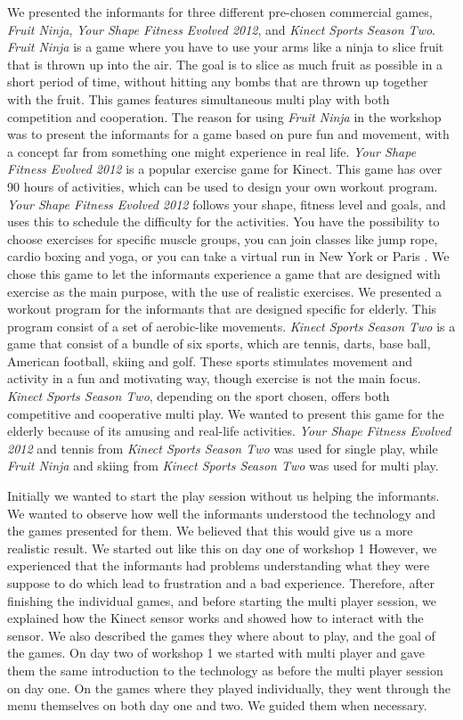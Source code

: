 We presented the informants for three different pre-chosen commercial games, \emph{Fruit Ninja}, \emph{Your Shape Fitness Evolved 2012}, and \emph{Kinect Sports Season Two}. \emph{Fruit Ninja} is a game where you have to use your arms like a ninja to slice fruit that is thrown up into the air. The goal is to slice as much fruit as possible in a short period of time, without hitting any bombs that are thrown up together with the fruit. This games features simultaneous multi play with both competition and cooperation. The reason for using \emph{Fruit Ninja} in the workshop was to present the informants for a game based on pure fun and movement, with a concept far from something one might experience in real life. \emph{Your Shape Fitness Evolved 2012} is a popular exercise game for Kinect. This game has over 90 hours of activities, which can be used to design your own workout program. \emph{Your Shape Fitness Evolved 2012} follows your shape, fitness level and goals, and uses this to schedule the difficulty for the activities. You have the possibility to choose exercises for specific muscle groups, you can join classes like jump rope, cardio boxing and yoga, or you can take a virtual run in New York or Paris \cite{yourshape}. We chose this game to let the informants experience a game that are designed with exercise as the main purpose, with the use of realistic exercises. We presented a workout program for the informants that are designed specific for elderly. This program consist of a set of aerobic-like movements. \emph{Kinect Sports Season Two} is a game that consist of a bundle of six sports, which are tennis, darts, base ball, American football, skiing and golf. These sports stimulates movement and activity in a fun and motivating way, though exercise is not the main focus. \emph{Kinect Sports Season Two}, depending on the sport chosen, offers both competitive and cooperative multi play. We wanted to present this game for the elderly because of its amusing and real-life activities. \emph{Your Shape Fitness Evolved 2012} and tennis from \emph{Kinect Sports Season Two} was used for single play, while \emph{Fruit Ninja} and skiing from \emph{Kinect Sports Season Two} was used for multi play. 

Initially we wanted to start the play session without us helping the informants. We wanted to observe how well the informants understood the technology and the games presented for them. We believed that this would give us a more realistic result. We started out like this on day one of workshop 1 However, we experienced that the informants had problems understanding what they were suppose to do which lead to frustration and a bad experience. Therefore, after finishing the individual games, and before starting the multi player session, we explained how the Kinect sensor works and showed how to interact with the sensor. We also described the games they where about to play, and the goal of the games. On day two of workshop 1 we started with multi player and gave them the same introduction to the technology as before the multi player session on day one. On the games where they played individually, they went through the menu themselves on both day one and two. We guided them when necessary. 

